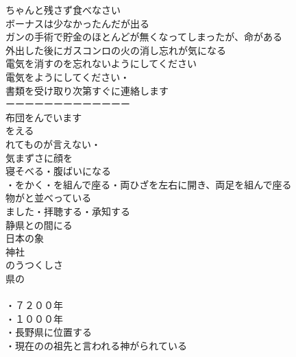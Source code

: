 ちゃんと残さず食べなさい\\
ボーナスは少なかったんだが出る\\
ガンの手術で貯金のほとんどが無くなってしまったが、命がある\\

外出した後にガスコンロの火の消し忘れが気になる\\
電気を消すのを忘れないようにしてください\\
電気をようにしてください・\\
書類を受け取り次第すぐに連絡します\\

ーーーーーーーーーーーーー\\

布団をんでいます\\
をえる\\
れてものが言えない・\\
気まずさに顔を\\
寝そべる・腹ばいになる\\
・をかく・を組んで座る・両ひざを左右に開き、両足を組んで座る\\
物がと並べっている\\
ました・拝聴する・承知する\\

静県との間にる\\
日本の象\\
神社\\
のうつくしさ\\
県の\\
\\
・７２００年\\
・１０００年\\
・長野県に位置する\\
・現在のの祖先と言われる神がられている\\

